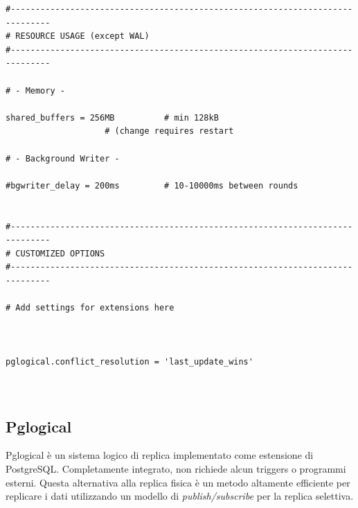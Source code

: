 \begin{verbatim}
#------------------------------------------------------------------------------
# RESOURCE USAGE (except WAL)
#------------------------------------------------------------------------------

# - Memory -

shared_buffers = 256MB			# min 128kB
					# (change requires restart

# - Background Writer -

#bgwriter_delay = 200ms			# 10-10000ms between rounds


#------------------------------------------------------------------------------
# CUSTOMIZED OPTIONS
#------------------------------------------------------------------------------

# Add settings for extensions here



pglogical.conflict_resolution = 'last_update_wins'



\end{verbatim}
 \vspace{-0.3cm}
 
\item
\subsection{Pglogical}
Pglogical \`{e} un sistema logico di replica implementato come estensione di PostgreSQL. Completamente integrato, non richiede alcun triggers o programmi esterni. Questa alternativa alla replica fisica \`{e} un metodo altamente efficiente per replicare i dati utilizzando un modello di \textit{publish/subscribe} per la replica selettiva.\cite{etichetta3}


